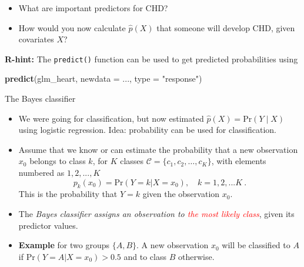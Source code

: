 \documentclass[10pt,ignorenonframetext,]{beamer}
\newenvironment{Shaded}{\begin{snugshade}}{\end{snugshade}}
\newcommand{\KeywordTok}[1]{\textcolor[rgb]{0.13,0.29,0.53}{\textbf{#1}}}
\newcommand{\DataTypeTok}[1]{\textcolor[rgb]{0.13,0.29,0.53}{#1}}
\newcommand{\StringTok}[1]{\textcolor[rgb]{0.31,0.60,0.02}{#1}}
\newcommand{\NormalTok}[1]{#1}
\providecommand{\tightlist}{%
  \setlength{\itemsep}{0pt}\setlength{\parskip}{0pt}}
\begin{document}
\begin{frame}[fragile]

\begin{itemize}
\item
  What are important predictors for CHD?
\item
  How would you now calculate \(\hat{p}(X)\) that someone will develop
  CHD, given covariates \(X\)?
\end{itemize}

\vspace{5mm}

\textbf{R-hint:} The \texttt{predict()} function can be used to get
predicted probabilities using

\scriptsize

\begin{Shaded}
\begin{Highlighting}[]
\KeywordTok{predict}\NormalTok{(glm_heart, }\DataTypeTok{newdata =}\NormalTok{ ..., }\DataTypeTok{type =} \StringTok{"response"}\NormalTok{)}
\end{Highlighting}
\end{Shaded}

\end{frame}

\begin{frame}{The Bayes classifier}

\begin{itemize}
\tightlist
\item
  We were going for classification, but now estimated
  \(\hat{p}(X)=\text{Pr}(Y \mid X)\) using logistic regression. Idea:
  probability can be used for classification.
\end{itemize}

\vspace{0mm}

\begin{itemize}
\item
  Assume that we know or can estimate the probability that a new
  observation \(x_0\) belongs to class \(k\), for \(K\) classes
  \(\mathcal{C} = \{c_1, c_2,\ldots, c_K\}\), with elements numbered as
  \(1, 2, ..., K\)
  \[p_k(x_0) = \text{Pr}(Y=k | X=x_0), \quad k = 1, 2, ... K \ .\] This
  is the probability that \(Y=k\) given the observation \(x_0\).
  \vspace{1mm}
\item
  The \emph{Bayes classifier assigns an observation to
  \textcolor{red}{the most likely class}}, given its predictor values.
\item
  \textbf{Example} for two groups \(\{A, B\}\). A new observation
  \(x_0\) will be classified to \(A\) if
  \(\text{Pr}(Y=A | X=x_0) > 0.5\) and to class \(B\) otherwise.
\end{itemize}

\end{frame}
\end{document}
